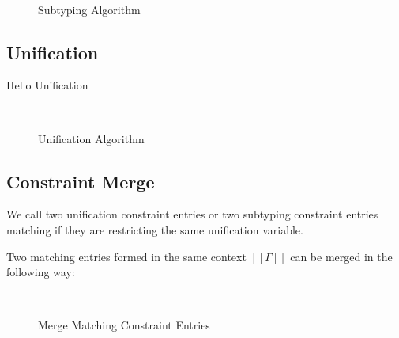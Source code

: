    \begin{figure}[h]
        \hfill\\
        \ottdefnANsub{}
        \ottdefnAPsup{}
        \caption{Subtyping Algorithm}
        \label{fig:alg-subtyping}
    \end{figure}

\subsection{Unification}

Hello Unification

\begin{figure}[h]
  \hfill
  \begin{multicols}{2}
  \ottdefnUNUnif{}
  \columnbreak\\
  \ottdefnUPUnif{}
  \end{multicols}
  \caption{Unification Algorithm}
  \label{fig:unification}
\end{figure}

\subsection{Constraint Merge}

\begin{definition} 
  We call two unification constraint entries 
  or two subtyping constraint entries matching 
  if they are restricting the same unification variable.
\end{definition}

Two matching entries formed in the same context $[[Γ]]$ 
can be merged in the following way:

\begin{figure}[h]
  \ottdefnSCME\\

  \label{fig:merge-entries}
  \caption{Merge Matching Constraint Entries}
\end{figure}

